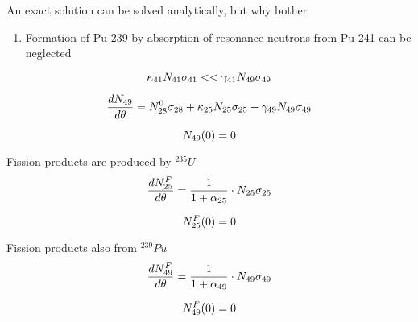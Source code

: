 \documentclass[aspectratio=1610,pdftex,dvipsnames,compress,xcolor={dvipsnames}]{beamer}
\begin{document}
\begin{frame}{An exact solution can be solved analytically, but why bother}
    \begin{enumerate}[series=outerlist,topsep=0pt,itemsep=7pt,leftmargin=*,label=(\arabic*)]
        \item[]Formation of Pu-239 by absorption of resonance neutrons from Pu-241 can be neglected
    \end{enumerate}

    \vspace*{\fill}

    \begin{equation}
        \LARGE
        \kappa_{41} N_{41} \sigma_{41} << \gamma_{41} N_{49} \sigma_{49}
    \end{equation}
    
    \begin{equation}
        \LARGE
        \frac{dN_{49}}{d\theta}=N_{28}^0\sigma_{28} + \kappa_{25} N_{25}\sigma_{25}-\gamma_{49} N_{49} \sigma_{49}
    \end{equation}
    
    \begin{equation}
        \LARGE
        N_{49}(0) = 0
    \end{equation}
\end{frame}


\begin{frame}{Fission products are produced by $^{235}U$}
    \begin{equation}
        \LARGE
        \frac{dN_{25}^F}{d\theta}=\frac{1}{1 + \alpha_{25}}\cdot N_{25}\sigma_{25}
    \end{equation}
    
    \begin{equation}
        \LARGE
        N_{25}^F(0)=0
    \end{equation}
\end{frame}


\begin{frame}{Fission products also from $^{239}Pu$}
    \begin{equation}
        \LARGE
        \frac{dN_{49}^F}{d\theta}=\frac{1}{1 + \alpha_{49}}\cdot N_{49}\sigma_{49}
    \end{equation}
    
    \begin{equation}
        \LARGE
        N_{49}^F(0)=0
    \end{equation}
\end{frame}
\end{document}
